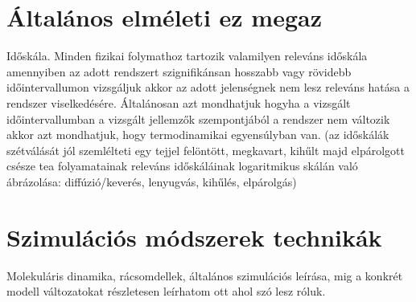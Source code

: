 \section{Általános elméleti ez megaz}
Időskála. Minden fizikai folymathoz tartozik valamilyen releváns időskála amennyiben az adott rendszert szignifikánsan hosszabb vagy rövidebb időintervallumon vizsgáljuk akkor az adott jelenségnek nem lesz releváns hatása a rendszer viselkedésére. Általánosan azt mondhatjuk hogyha a vizsgált időintervallumban a vizsgált jellemzők szempontjából a rendszer nem változik akkor azt mondhatjuk, hogy termodinamikai egyensúlyban van. (az időskálák szétválását jól szemlélteti egy tejjel felöntött, megkavart, kihűlt majd elpárolgott csésze tea folyamatainak releváns időskáláinak logaritmikus skálán való ábrázolása: diffúzió/keverés, lenyugvás, kihűlés, elpárolgás)


\section{Szimulációs módszerek technikák}
Molekuláris dinamika, rácsomdellek, általános szimulációs leírása, mig a konkrét modell változatokat részletesen leírhatom ott ahol szó lesz róluk.






